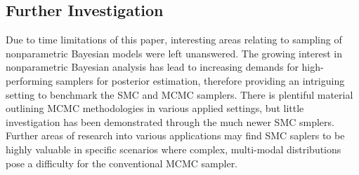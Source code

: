 \documentclass[12pt]{elsarticle}
\begin{document}
\subsection*{Further Investigation}
Due to time limitations of this paper, interesting areas relating to sampling of nonparametric Bayesian models were left unanswered. The growing interest in nonparametric Bayesian analysis has lead to increasing demands for high-performing samplers for posterior estimation, therefore providing an intriguing setting to benchmark the SMC and MCMC samplers. There is plentiful material outlining MCMC methodologies in various applied settings, but little investigation has been demonstrated through the much newer SMC smplers. Further areas of research into various applications may find SMC saplers to be highly valuable in specific scenarios where complex, multi-modal distributions pose a difficulty for the conventional MCMC sampler.




\end{document}
